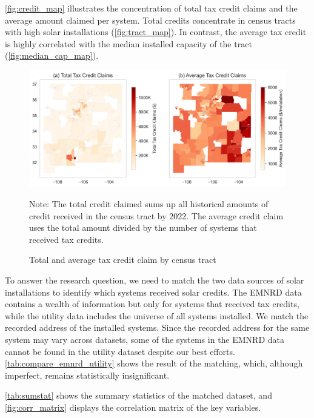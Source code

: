 \documentclass[12pt,twoside,letterpaper]{article}
\begin{document}
\autoref{fig:credit_map} illustrates the concentration of total tax credit claims and the average amount claimed per system. Total credits concentrate in census tracts with high solar installations (\autoref{fig:tract_map}). In contrast, the average tax credit is highly correlated with the median installed capacity of the tract (\autoref{fig:median_cap_map}).

\begin{figure}[H]
    \centering
\includegraphics[width=1\textwidth]{figures/credit_claim_maps.png}
    \caption{Total and average tax credit claim by census tract}
    \label{fig:credit_map}
      \begin{flushleft}
        \footnotesize Note: The total credit claimed sums up all historical amounts of credit received in the census tract by 2022. The average credit claim uses the total amount divided by the number of systems that received tax credits.
    \end{flushleft}
\end{figure}

To answer the research question, we need to match the two data sources of solar installations to identify which systems received solar credits. The EMNRD data contains a wealth of information but only for systems that received tax credits, while the utility data includes the universe of all systems installed. We match the recorded address of the installed systems. Since the recorded address for the same system may vary across datasets, some of the systems in the EMNRD data cannot be found in the utility dataset despite our best efforts. \autoref{tab:compare_emnrd_utility} shows the result of the matching, which, although imperfect, remains statistically insignificant.


\autoref{tab:sumstat} shows the summary statistics of the matched dataset, and \autoref{fig:corr_matrix} displays the correlation matrix of the key variables.
\end{document}
